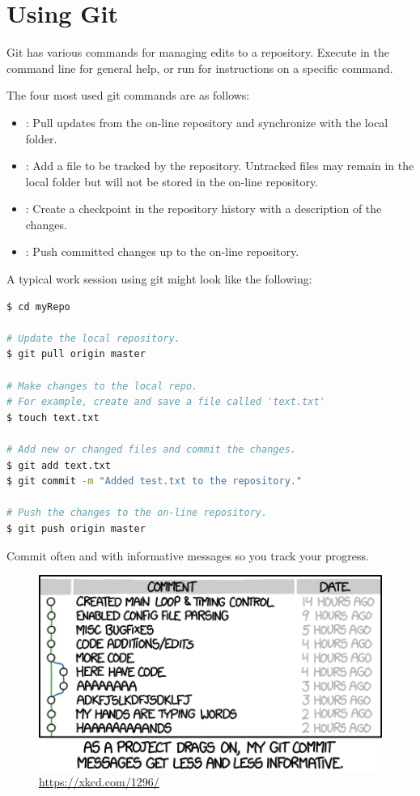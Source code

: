 \section*{Using Git} %

Git has various commands for managing edits to a repository.
Execute  in the command line for general help, or run  for instructions on a specific command.

The four most used git commands are as follows:
\begin{itemize}
\item {}: Pull updates from the on-line repository and synchronize with the local folder.
\item {}: Add a file to be tracked by the repository. Untracked files may remain in the local folder but will not be stored in the on-line repository.
\item {}: Create a checkpoint in the repository history with a description of the changes.
\item {}: Push committed changes up to the on-line repository.
\end{itemize}
A typical work session using git might look like the following:

\begin{lstlisting}[language=bash]
$ cd myRepo

# Update the local repository.
$ git pull origin master

# Make changes to the local repo.
# For example, create and save a file called 'text.txt'
$ touch text.txt

# Add new or changed files and commit the changes.
$ git add text.txt
$ git commit -m "Added test.txt to the repository."

# Push the changes to the on-line repository.
$ git push origin master
\end{lstlisting}

Commit often and with informative messages so you track your progress.

\begin{figure}[H]
\centering
\includegraphics[width=.7\textwidth]{xkcd2.png}
\caption{\url{https://xkcd.com/1296/}}
\end{figure}

